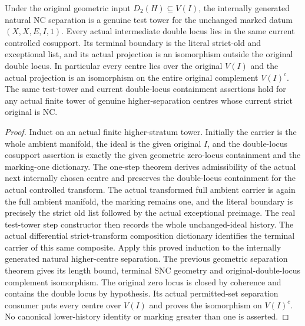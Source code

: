 \begin{theorem}
\label{hir:general-nc-double-locus-original-ideal-test-prephase}
\leanok
Under the original geometric input $D_2(H)\subseteq V(I)$, the internally
generated natural NC separation is a genuine test tower for the unchanged
marked datum $(X,X,E,I,1)$. Every actual intermediate double locus lies
in the same current controlled cosupport. Its terminal boundary is the
literal strict-old and exceptional list, and its actual projection is an
isomorphism outside the original double locus. In particular every centre
lies over the original $V(I)$ and the actual projection is an isomorphism
on the entire original complement $V(I)^c$. The same test-tower and current
double-locus containment assertions hold for any actual finite tower of
genuine higher-separation centres whose current strict original is NC.
\end{theorem}
\begin{proof}
Induct on an actual finite higher-stratum tower. Initially
the carrier is the whole ambient manifold, the ideal is the given original
$I$, and the double-locus cosupport assertion is exactly the given geometric
zero-locus containment and the marking-one dictionary. The one-step theorem
derives admissibility of the actual next internally chosen centre and
preserves the double-locus containment for the actual controlled transform.
The actual transformed full ambient carrier is again the full ambient
manifold, the marking remains one, and the literal boundary is precisely
the strict old list followed by the actual exceptional preimage. The real
test-tower step constructor then records the whole unchanged-ideal history.
The actual differential strict-transform composition dictionary identifies
the terminal carrier of this same composite. Apply this proved induction
to the internally generated natural higher-centre separation. The previous
geometric separation theorem gives its length bound, terminal SNC geometry
and original-double-locus complement isomorphism. The original zero locus
is closed by coherence and contains the double locus by hypothesis. Its
actual permitted-set separation consumer puts every centre over $V(I)$
and proves the isomorphism on $V(I)^c$. No canonical lower-history identity
or marking greater than one is asserted.
\end{proof}
